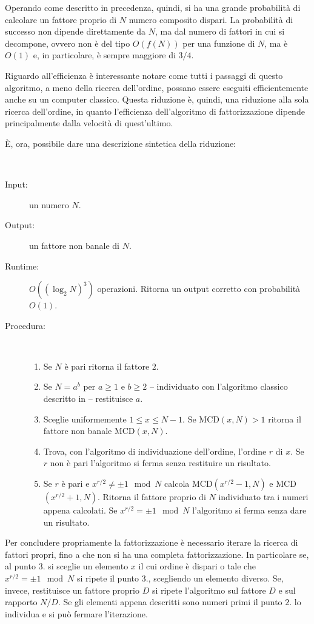 Operando come descritto in precedenza, quindi, si ha una grande probabilità di calcolare un fattore proprio di $N$ numero composito dispari. 
La probabilità di successo non dipende direttamente da $N$, ma dal numero di fattori in cui si decompone, ovvero non è del tipo $O\left(f(N)\right)$ per una funzione di $N$, ma è $O(1)$ e, in particolare, è sempre maggiore di $3/4$.

Riguardo all'efficienza è interessante notare come tutti i passaggi di questo algoritmo, a meno della ricerca dell'ordine, possano essere eseguiti efficientemente anche su un computer classico.
Questa riduzione è, quindi, una riduzione alla sola ricerca dell'ordine, in quanto l'efficienza dell'algoritmo di fattorizzazione dipende principalmente dalla velocità di quest'ultimo.

È, ora, possibile dare una descrizione sintetica della riduzione:
\begin{algo}\
 \begin{description}
  \item [Input:] un numero $N$.
  \item [Output:] un fattore non banale di $N$.
  \item [Runtime:] $O\left((\log_2 N)^3\right)$ operazioni. Ritorna un output corretto con probabilità $O(1)$.
  \item [Procedura:] \ 
    \begin{enumerate}
     \item Se $N$ è pari ritorna il fattore $2$.
     \item Se $N = a^b$ per $a \geq 1$ e $b \geq 2$ -- individuato con l'algoritmo classico descritto in \cite{Article:PerfectPowers} -- restituisce $a$.     
     \item Sceglie uniformemente $1 \leq x \leq N-1$. Se MCD$(x,N) > 1$ ritorna il fattore non banale MCD$(x,N)$.
     \item Trova, con l'algoritmo di individuazione dell'ordine, l'ordine $r$ di $x$. Se $r$ non è pari l'algoritmo si ferma senza restituire un risultato.
     \item Se $r$ è pari e $x^{r/2} \neq \pm 1 \mod N$ calcola MCD$(x^{r/2}-1,N)$ e MCD$(x^{r/2}+1,N)$. Ritorna il fattore proprio di $N$ individuato tra i numeri appena calcolati. Se $x^{r/2} = \pm 1 \mod N$ l'algoritmo si ferma senza dare un risultato.
    \end{enumerate}
 \end{description}
\end{algo}
Per concludere propriamente la fattorizzazione è necessario iterare la ricerca di fattori propri, fino a che non si ha una completa fattorizzazione.
In particolare se, al punto $3.$ si sceglie un elemento $x$ il cui ordine è dispari o tale che $x^{r/2} = \pm 1 \mod N$ si ripete il punto $3.$, scegliendo un elemento diverso.
Se, invece, restituisce un fattore proprio $D$ si ripete l'algoritmo sul fattore $D$ e sul rapporto $N/D$.
Se gli elementi appena descritti sono numeri primi il punto $2.$ lo individua e si può fermare l'iterazione.


